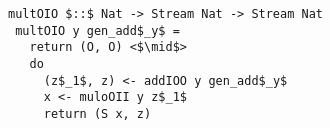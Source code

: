 \begin{figure}[!t]
  \centering
  \begin{minipage}{0.52\columnwidth}
    \begin{lstlisting}[frame=tb]
 multOIO $::$ Nat -> Stream Nat -> Stream Nat
 multOIO y gen_add$_y$ =
   return (O, O) <$\mid$>
   do
     (z$_1$, z) <- addIOO y gen_add$_y$
     x <- muloOII y z$_1$
     return (S x, z)
    \end{lstlisting}
  \end{minipage}
\end{figure}
